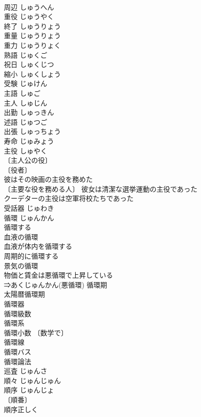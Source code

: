 \documentclass[8pt]{extreport}
\begin{document}
\begin{CJK}{UTF8}{min}
\\	周辺	しゅうへん	
\\	重役	じゅうやく	
\\	終了	しゅうりょう	
\\	重量	じゅうりょう	
\\	重力	じゅうりょく	
\\	熟語	じゅくご	
\\	祝日	しゅくじつ	
\\	縮小	しゅくしょう	
\\	受験	じゅけん	
\\	主語	しゅご	
\\	主人	しゅじん	
\\	出勤	しゅっきん	
\\	述語	じゅつご	
\\	出張	しゅっちょう	
\\	寿命	じゅみょう	
\\	主役	しゅやく	
\\	〔主人公の役〕
\\	〔役者〕
\\	彼はその映画の主役を務めた 
\\	〔主要な役を務める人〕 彼女は清潔な選挙運動の主役であった 
\\	クーデターの主役は空軍将校たちであった 
\\	受話器	じゅわき	
\\	循環	じゅんかん	
\\	循環する 
\\	血液の循環 
\\	血液が体内を循環する 
\\	周期的に循環する 
\\	景気の循環 
\\	物価と賃金は悪循環で上昇している 
\\	⇒あくじゅんかん(悪循環) 循環期 
\\	太陽暦循環期 
\\	循環器 
\\	循環級数 
\\	循環系 
\\	循環小数 〔数学で〕
\\	循環線 
\\	循環バス 
\\	循環論法 
\\	巡査	じゅんさ	
\\	順々	じゅんじゅん	
\\	順序	じゅんじょ	
\\	〔順番〕
\\	順序正しく 

\end{CJK}
\end{document}
